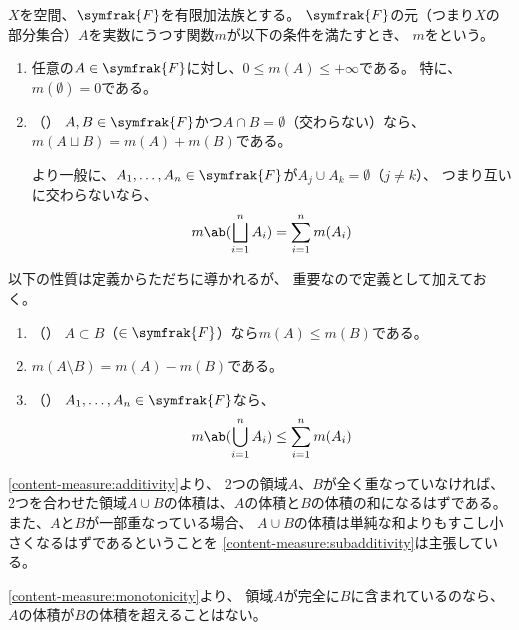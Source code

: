 \documentclass[../sotsu.tex]{subfiles}
\begin{document}
\begin{definition}
    \label{dfn:content-measure}
    $X$を空間、$\symfrak{F}$を有限加法族とする。
    $\symfrak{F}$の元（つまり$X$の部分集合）$A$を実数にうつす関数$m$が以下の条件を満たすとき、
    $m$をという。
    \begin{enumerate}
        \item \label{content-measure:positivity}
            任意の$A \in \symfrak{F}$に対し、$0 \leq m(A) \leq +\infty$である。
            特に、$m(\emptyset) = 0$である。
        \item \label{content-measure:additivity}（）
            $A, B \in \symfrak{F}$かつ$A \cap B = \emptyset$（交わらない）なら、
            $m(A \sqcup B) = m(A) + m(B)$である。

            より一般に、$A_1, \dots, A_n \in \symfrak{F}$が$A_j \cup A_k = \emptyset$（$j \neq k$）、
            つまり互いに交わらないなら、
            \begin{equation*}
                m \ab( \bigsqcup_{i=1}^{n} A_i ) = \sum_{i=1}^{n} m(A_i)
            \end{equation*}
    \end{enumerate}
    以下の性質は定義からただちに導かれるが、
    重要なので定義として加えておく。
    \begin{enumerate}[resume]
        \item \label{content-measure:monotonicity}（）
            $A \subset B$（$\in \symfrak{F}$）なら$m(A) \leq m(B)$である。
        \item $m(A \setminus B) = m(A) - m(B)$である。
        \item \label{content-measure:subadditivity}（）
            $A_1, \dots, A_n \in \symfrak{F}$なら、
            \begin{equation*}
                m \ab( \bigcup_{i=1}^{n} A_i ) \leq \sum_{i=1}^{n} m(A_i)
            \end{equation*}
    \end{enumerate}
\end{definition}

\cref{content-measure:additivity}より、
2つの領域$A$、$B$が全く重なっていなければ、
2つを合わせた領域$A \cup B$の体積は、$A$の体積と$B$の体積の和になるはずである。
また、$A$と$B$が一部重なっている場合、
$A \cup B$の体積は単純な和よりもすこし小さくなるはずであるということを
\cref{content-measure:subadditivity}は主張している。

\cref{content-measure:monotonicity}より、
領域$A$が完全に$B$に含まれているのなら、$A$の体積が$B$の体積を超えることはない。
\end{document}
